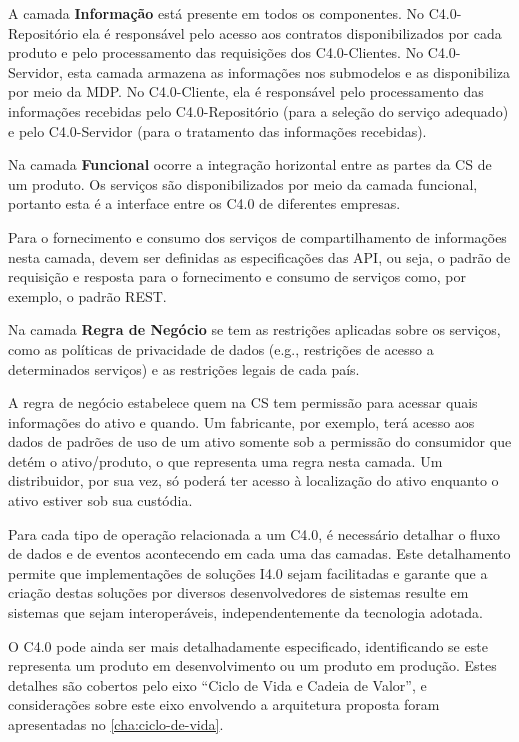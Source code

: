 A camada \textbf{Informação} está presente em todos os componentes. No C4.0-Repositório ela é responsável pelo acesso aos contratos disponibilizados por cada produto e pelo processamento das requisições dos C4.0-Clientes. No C4.0-Servidor, esta camada armazena as informações nos submodelos e as disponibiliza por meio da MDP. No C4.0-Cliente, ela é responsável pelo processamento das informações recebidas pelo C4.0-Repositório (para a seleção do serviço adequado) e pelo C4.0-Servidor (para o tratamento das informações recebidas).

Na camada \textbf{Funcional} ocorre a integração horizontal entre as partes da CS de um produto. Os serviços são disponibilizados por meio da camada funcional, portanto esta é a interface entre os C4.0 de diferentes empresas.

Para o fornecimento e consumo dos serviços de compartilhamento de informações nesta camada, devem ser definidas as especificações das API, ou seja, o padrão de requisição e resposta para o fornecimento e consumo de serviços como, por exemplo, o padrão REST.

Na camada \textbf{Regra de Negócio} se tem as restrições aplicadas sobre os serviços, como as políticas de privacidade de dados (e.g., restrições de acesso a determinados serviços) e as restrições legais de cada país.

A regra de negócio estabelece quem na CS tem permissão para acessar quais informações do ativo e quando. Um fabricante, por exemplo, terá acesso aos dados de padrões de uso de um ativo somente sob a permissão do consumidor que detém o ativo/produto, o que representa uma regra nesta camada. Um distribuidor, por sua vez, só poderá ter acesso à localização do ativo enquanto o ativo estiver sob sua custódia.

Para cada tipo de operação relacionada a um C4.0, é necessário detalhar o fluxo de dados e de eventos acontecendo em cada uma das camadas. Este detalhamento permite que implementações de soluções I4.0 sejam facilitadas e garante que a criação destas soluções por diversos desenvolvedores de sistemas resulte em sistemas que sejam interoperáveis, independentemente da tecnologia adotada.

O C4.0 pode ainda ser mais detalhadamente especificado, identificando se este representa um produto em desenvolvimento ou um produto em produção. Estes detalhes são cobertos pelo eixo ``Ciclo de Vida e Cadeia de Valor'', e considerações sobre este eixo envolvendo a arquitetura proposta foram apresentadas no \autoref{cha:ciclo-de-vida}.

